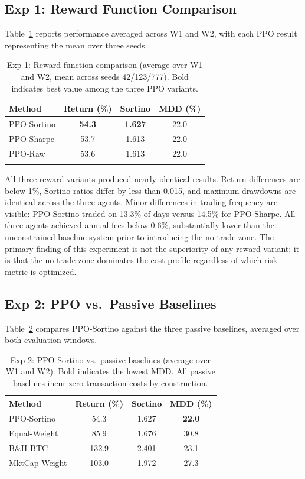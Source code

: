 \documentclass[pdflatex,sn-mathphys-num]{sn-jnl}
\begin{document}
\subsection{Exp 1: Reward Function Comparison}

Table~\ref{tab:exp1} reports performance averaged across W1 and W2, with each
PPO result representing the mean over three seeds.

\begin{table}[h]
\caption{Exp 1: Reward function comparison (average over W1 and W2, mean across
seeds 42/123/777). Bold indicates best value among the three PPO variants.}\label{tab:exp1}
\begin{tabular*}{\textwidth}{@{\extracolsep\fill}lccc}
\toprule
Method & Return (\%) & Sortino & MDD (\%) \\
\midrule
PPO-Sortino  & \textbf{54.3} & \textbf{1.627} & 22.0 \\
PPO-Sharpe   & 53.7 & 1.613 & 22.0 \\
PPO-Raw      & 53.6 & 1.613 & 22.0 \\
\botrule
\end{tabular*}
\end{table}

All three reward variants produced nearly identical results. Return differences
are below 1\%, Sortino ratios differ by less than 0.015, and maximum drawdowns
are identical across the three agents. Minor differences in trading frequency
are visible: PPO-Sortino traded on 13.3\% of days versus 14.5\% for PPO-Sharpe.
All three agents achieved annual fees below 0.6\%, substantially lower than
the unconstrained baseline system prior to introducing the no-trade zone. The
primary finding of this experiment is not the superiority of any reward variant;
it is that the no-trade zone dominates the cost profile regardless of which risk
metric is optimized.

\subsection{Exp 2: PPO vs.\ Passive Baselines}

Table~\ref{tab:exp2} compares PPO-Sortino against the three passive baselines,
averaged over both evaluation windows.

\begin{table}[h]
\caption{Exp 2: PPO-Sortino vs.\ passive baselines (average over W1 and W2).
Bold indicates the lowest MDD. All passive baselines incur zero transaction
costs by construction.}\label{tab:exp2}
\begin{tabular*}{\textwidth}{@{\extracolsep\fill}lccc}
\toprule
Method & Return (\%) & Sortino & MDD (\%) \\
\midrule
PPO-Sortino   & 54.3  & 1.627 & \textbf{22.0} \\
Equal-Weight  & 85.9  & 1.676 & 30.8 \\
B\&H BTC      & 132.9 & 2.401 & 23.1 \\
MktCap-Weight & 103.0 & 1.972 & 27.3 \\
\botrule
\end{tabular*}
\end{table}
\end{document}

